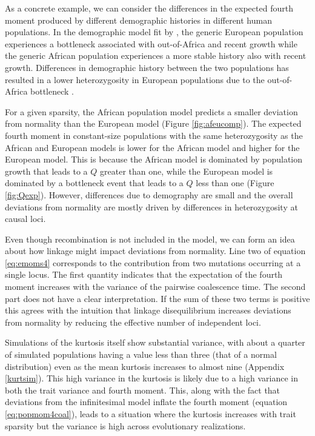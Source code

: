 As a concrete example, we can consider the differences in the expected fourth
moment produced by different demographic histories in different human
populations. In the demographic model fit by \citet{Tennessen2012}, the generic
European population experiences a bottleneck associated with out-of-Africa and
recent growth while the generic African population experiences a more stable
history also with recent growth. Differences in demographic history between the
two populations has resulted in a lower heterozygosity in European populations
due to the out-of-Africa bottleneck \citep{Yu2002}.

For a given sparsity, the African population model predicts a smaller deviation
from normality than the European model (Figure \ref{fig:afeucomp}). The expected
fourth moment in constant-size populations with the same heterozygosity as the
African and European models is lower for the African model and higher for the
European model. This is because the African model is dominated by population
growth that leads to a $Q$ greater than one, while the European model is
dominated by a bottleneck event that leads to a $Q$ less than one
(Figure \ref{fig:Qexp}). However, differences due to demography are small and
the overall deviations from normality are mostly driven by differences in
heterozygosity at causal loci.

Even though recombination is not included in the model, we can form an idea
about how linkage might impact deviations from normality. Line two of
equation \eqref{eq:emoms4} corresponds to the contribution from two mutations
occurring at a single locus. The first quantity indicates that the expectation
of the fourth moment increases with the variance of the pairwise coalescence
time. The second part does not have a clear interpretation. If the sum of these
two terms is positive this agrees with the intuition that linkage disequilibrium
increases deviations from normality by reducing the effective number of
independent loci.

Simulations of the kurtosis itself show substantial variance, with about a
quarter of simulated populations having a value less than three (that of a
normal distribution) even as the mean kurtosis increases to almost nine
(Appendix \ref{kurtsim}). This high variance in the kurtosis is likely due to a
high variance in both the trait variance and fourth moment. This, along with the
fact that deviations from the infinitesimal model inflate the fourth moment
(equation \eqref{eq:popmom4coal}), leads to a situation where the kurtosis
increases with trait sparsity but the variance is high across evolutionary
realizations.
